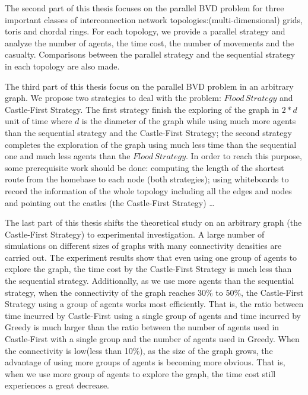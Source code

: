 The second part of this thesis focuses on the parallel BVD problem for three important classes of interconnection network topologies:(multi-dimensional) grids, toris and chordal rings. For each topology, we provide a parallel strategy and analyze the number of agents, the time cost, the number of movements and the casualty. Comparisons between the parallel strategy and the sequential strategy in each topology are also made.

The third part of this thesis focus on the parallel BVD problem in an arbitrary graph. We propose two strategies to deal with the problem: $Flood\,Strategy$ and {\sc Castle-First} Strategy. The first strategy finish the exploring of the graph in $2*d$ unit of time where $d$ is the diameter of the graph while using much more agents than the sequential strategy and the {\sc Castle-First} Strategy; the second strategy completes the exploration of the graph using much less time than the sequential one and much less agents than the $Flood\,Strategy$. In order to reach this purpose, some prerequisite work should be done: computing the length of the shortest route from the homebase to each node (both strategies); using whiteboards to record the information of the whole topology including all the edges and nodes and pointing out the castles (the {\sc Castle-First} Strategy) \ldots

The last part of this thesis shifts the theoretical study on an arbitrary graph (the {\sc Castle-First} Strategy) to experimental investigation. A large number of simulations on different sizes of graphs with many connectivity densities are carried out. The experiment results show that even using one group of agents to explore the graph, 
the time cost by the  {\sc Castle-First} Strategy is much less than the sequential strategy. Additionally, as we use more agents than the sequential strategy, when the connectivity of the graph reaches 30\% to 50\%, the {\sc Castle-First} Strategy using a group of agents works most efficiently. That is, the ratio between time incurred by {\sc Castle-First} using a single group of agents and time incurred by Greedy is much larger than the ratio between the number of agents used in {\sc Castle-First} with a single group and the number of agents used in Greedy. When the connectivity is low(less than 10\%), as the size of the graph grows, the advantage of using more groups of agents is becoming more obvious. That is, when we use more group of agents to explore the graph, the time cost still experiences a great decrease.


